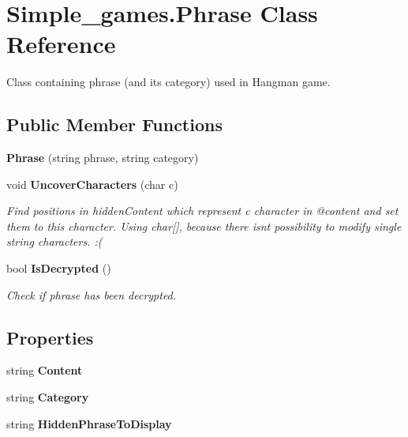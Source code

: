 \section{Simple\+\_\+games.\+Phrase Class Reference}
\label{class_simple__games_1_1_phrase}


Class containing phrase (and its category) used in Hangman game.  


\subsection*{Public Member Functions}
\begin{DoxyCompactItemize}
\item 
\mbox{\label{class_simple__games_1_1_phrase_ae25309fdfd530b589c2e8ba1c71b1cf1}} 
{\bfseries Phrase} (string phrase, string category)
\item 
void \textbf{ Uncover\+Characters} (char c)
\begin{DoxyCompactList}\small\item\em Find positions in hidden\+Content which represent c character in @content and set them to this character. Using char[], because there isn\textquotesingle{}t possibility to modify single string characters. \+:( \end{DoxyCompactList}\item 
bool \textbf{ Is\+Decrypted} ()
\begin{DoxyCompactList}\small\item\em Check if phrase has been decrypted. \end{DoxyCompactList}\end{DoxyCompactItemize}
\subsection*{Properties}
\begin{DoxyCompactItemize}
\item 
\mbox{\label{class_simple__games_1_1_phrase_ad8c359f8f162209b2c1c6e0232389637}} 
string {\bfseries Content}\hspace{0.3cm}{\ttfamily  [get]}
\item 
\mbox{\label{class_simple__games_1_1_phrase_ad75f04fd9c7f03818d4a8c38292699e5}} 
string {\bfseries Category}\hspace{0.3cm}{\ttfamily  [get]}
\item 
\mbox{\label{class_simple__games_1_1_phrase_a9e3735ed10e5c7f11da0fc613e72a879}} 
string {\bfseries Hidden\+Phrase\+To\+Display}\hspace{0.3cm}{\ttfamily  [get]}
\end{DoxyCompactItemize}


